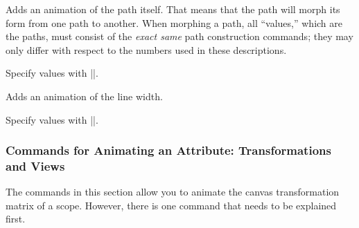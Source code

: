 \begin{command}{\pgfsys@animatepath}
  Adds an animation of the path itself. That means that the path will
  morph its form from one path to another. When morphing a path, all
  ``values,'' which are the paths, must consist of the  \emph{exact
    same} path construction commands; they may only differ with
  respect to the numbers used in these descriptions.
  
  Specify values with |\pgfsys@animation@path|.
\begin{codeexample}[width=3.3cm]
\end{codeexample}
\end{command}

\begin{command}{\pgfsys@animatelinewidth}
  Adds an animation of the line width.
  
  Specify values with |\pgfsys@animation@dimension|.
\begin{codeexample}[width=2cm]
\end{codeexample}
\end{command}


\subsubsection{Commands for Animating an Attribute: Transformations  and Views}

The commands in this section allow you to animate the canvas
transformation matrix of a scope. However, there is one command that
needs to be explained first.

